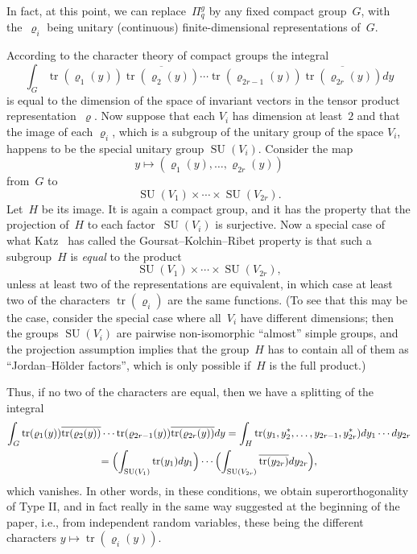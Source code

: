 \documentclass[oneside,11pt]{amsart}
\DeclareMathOperator{\Tr}{tr}
\DeclareMathOperator{\SU}{SU}
\renewcommand{\rho}{\varrho}
\begin{document}
In fact, at this point, we can replace~$\Pi^g_q$ by any fixed compact
group~$G$, with the~$\rho_i$ being unitary (continuous)
finite-dimensional representations of~$G$.
\par
According to the character theory of compact groups the integral
\begin{equation}\label{eq-integral}
  \int_{G}\Tr(\rho_1(y)) \overline{\Tr(\rho_2(y))}\cdots
  \Tr(\rho_{2r-1}(y)) \overline{\Tr(\rho_{2r}(y))} dy
\end{equation}
is equal to the dimension of the space of invariant vectors in the
tensor product representation~$\rho$. Now suppose that each $V_i$ has
dimension at least~$2$ and that the image of each $\rho_i$, which is a
subgroup of the unitary group of the space $V_i$, happens to be the
special unitary group $\SU(V_i)$.  Consider the map
$$
y\mapsto (\rho_1(y),\ldots,\rho_{2r}(y))
$$
from~$G$ to
$$
\SU(V_1)\times \cdots\times \SU(V_{2r}).
$$
Let~$H$ be its image. It is again a compact group, and it has the
property that the projection of~$H$ to each factor~$\SU(V_i)$ is
surjective. Now a special case of what Katz~\cite[\S 1.8,
Prop. 1.8.2]{Kat90} has called the Goursat--Kolchin--Ribet
property is that such a subgroup~$H$ is \emph{equal} to the product
$$
\SU(V_1)\times \cdots\times \SU(V_{2r}),
$$
unless at least two of the representations are equivalent, in which
case at least two of the characters $\Tr(\rho_i)$ are the same
functions. (To see that this may be the case, consider the special
case where all~$V_i$ have different dimensions; then the groups
$\SU(V_i)$ are pairwise non-isomorphic ``almost'' simple groups, and
the projection assumption implies that the group~$H$ has to contain
all of them as ``Jordan--H\"older factors'', which is only possible
if~$H$ is the full product.)

Thus, if no two of the characters are equal, then we have a splitting
of the integral
\begin{multline*}
  \int_{G}\Tr(\rho_1(y)) \overline{\Tr(\rho_2(y))}\cdots
  \Tr(\rho_{2r-1}(y)) \overline{\Tr(\rho_{2r}(y))} dy = \int_H
  \Tr(y_1,y_2^*,\ldots,y_{2r-1},y_{2r}^*)dy_1\cdots dy_{2r}
  \\
  = \Bigl(\int_{\SU(V_1)}\Tr(y_1)dy_1\Bigr)\cdots
  \Bigl(\int_{\SU(V_{2r})}\overline{\Tr(y_{2r})}dy_{2r}\Bigr),
\end{multline*}
which vanishes. In other words, in these conditions, we obtain
superorthogonality of Type II, and in fact really in the same way
suggested at the beginning of the paper, i.e., from independent random
variables, these being the different characters
$y\mapsto\Tr(\rho_i(y))$.
\end{document}
